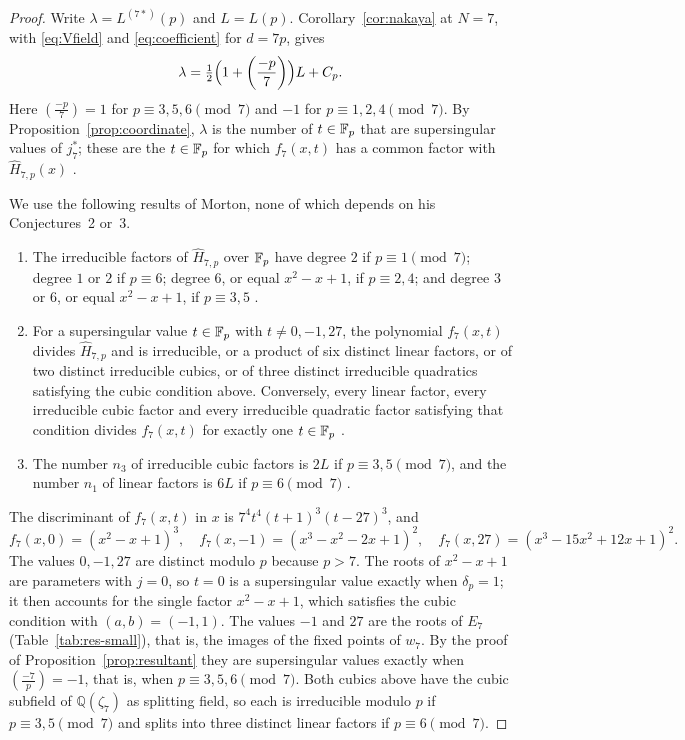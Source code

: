 \documentclass[11pt,a4paper]{article}
\theoremstyle{remark}\newtheorem{remark}[theorem]{Remark}
\numberwithin{equation}{section}
\newcommand{\Q}{\mathbb Q}\newcommand{\Z}{\mathbb Z}
\newcommand{\leg}[2]{\left(\frac{#1}{#2}\right)}
\begin{document}
\begin{proof}
	Write $\lambda=L^{(7*)}(p)$ and $L=L(p)$. Corollary~\ref{cor:nakaya} at $N=7$, with \eqref{eq:Vfield} and \eqref{eq:coefficient} for $d=7p$, gives
	\begin{equation}\label{eq:lambda7}
		\lambda=\tfrac12\Bigl(1+\leg{-p}{7}\Bigr)L+C_p .
	\end{equation}
	Here $\leg{-p}{7}=1$ for $p\equiv3,5,6\pmod7$ and $-1$ for $p\equiv1,2,4\pmod7$. By Proposition~\ref{prop:coordinate}, $\lambda$ is the number of $t\in\mathbb F_p$ that are supersingular values of $j_7^*$; these are the $t\in\mathbb F_p$ for which $f_7(x,t)$ has a common factor with $\widehat H_{7,p}(x)$ \cite[Section~3]{Morton7}.
	
	We use the following results of Morton, none of which depends on his Conjectures~2 or~3.
	\begin{enumerate}
		\item The irreducible factors of $\widehat H_{7,p}$ over $\mathbb F_p$ have degree $2$ if $p\equiv1\pmod7$; degree $1$ or $2$ if $p\equiv6$; degree $6$, or equal $x^2-x+1$, if $p\equiv2,4$; and degree $3$ or $6$, or equal $x^2-x+1$, if $p\equiv3,5$ \cite[Theorem~1]{Morton7}.
		\item For a supersingular value $t\in\mathbb F_p$ with $t\neq0,-1,27$, the polynomial $f_7(x,t)$ divides $\widehat H_{7,p}$ and is irreducible, or a product of six distinct linear factors, or of two distinct irreducible cubics, or of three distinct irreducible quadratics satisfying the cubic condition above. Conversely, every linear factor, every irreducible cubic factor and every irreducible quadratic factor satisfying that condition divides $f_7(x,t)$ for exactly one $t\in\mathbb F_p$ \cite[Section~3, Lemma~1 and Proposition~1]{Morton7}.
		\item The number $n_3$ of irreducible cubic factors is $2L$ if $p\equiv3,5\pmod7$, and the number $n_1$ of linear factors is $6L$ if $p\equiv6\pmod7$ \cite[Theorem~A]{Morton7}.
	\end{enumerate}
	The discriminant of $f_7(x,t)$ in $x$ is $7^4t^4(t+1)^3(t-27)^3$, and
	\[
	f_7(x,0)=(x^2-x+1)^3,\quad
	f_7(x,-1)=(x^3-x^2-2x+1)^2,\quad
	f_7(x,27)=(x^3-15x^2+12x+1)^2.
	\]
	The values $0,-1,27$ are distinct modulo $p$ because $p>7$. The roots of $x^2-x+1$ are parameters with $j=0$, so $t=0$ is a supersingular value exactly when $\delta_p=1$; it then accounts for the single factor $x^2-x+1$, which satisfies the cubic condition with $(a,b)=(-1,1)$. The values $-1$ and $27$ are the roots of $E_7$ (Table~\ref{tab:res-small}), that is, the images of the fixed points of $w_7$. By the proof of Proposition~\ref{prop:resultant} they are supersingular values exactly when $\leg{-7}{p}=-1$, that is, when $p\equiv3,5,6\pmod7$. Both cubics above have the cubic subfield of $\Q(\zeta_7)$ as splitting field, so each is irreducible modulo $p$ if $p\equiv3,5\pmod7$ and splits into three distinct linear factors if $p\equiv6\pmod7$.
	

\end{proof}
\end{document}
